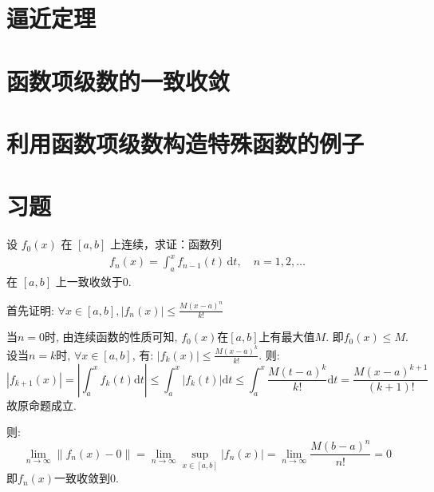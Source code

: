 \section{逼近定理}
\section{函数项级数的一致收敛}
\section{利用函数项级数构造特殊函数的例子}
\section{习题}

\begin{problem}
    设 \(f_0(x)\) 在 \([a, b]\) 上连续，求证：函数列
    \begin{align*}
        f_n(x) = \int_a^x f_{n-1}(t) \, \mathrm{d}t, \quad
        n = 1, 2, \dots
    \end{align*}
    在 \([a, b]\) 上一致收敛于0.
\end{problem}

\begin{solution}
    首先证明: \(\forall x \in [a,b], \left\vert f_{n}(x) \right\vert \le
    \frac{M(x-a)^{n}}{k!} \)

    当\(n=0\)时, 由连续函数的性质可知, \(f_{0}(x)\)在\([a,b]\)上有最大值\(M\).
    即\(f_{0}(x)\le M\).
    设当\(n=k\)时, \(\forall x \in [a,b]\), 有: \(\left\vert f_{k}(x)
        \right\vert \le
    \frac{M(x-a)^{k}}{k!}\). 则:
    \[
        \left\vert f_{k+1}(x) \right\vert
        = \left\vert \int_{a}^{x} f_{k}(t) \mathrm{d}t \right\vert
        \le \int_{a}^{x} \left\vert f_{k}(t) \right\vert \mathrm{d}t
        \le \int_{a}^{x} \frac{M(t-a)^{k}}{k!} \mathrm{d}t =
        \frac{M(x-a)^{k+1}}{(k+1)!}
    \]
    故原命题成立.

    则:
    \[
        \lim_{n \to \infty} \left\lVert f_{n}(x) - 0 \right\rVert
        =\lim_{n \to \infty} \sup_{x \in [a,b]} \left\vert f_{n}(x)
        \right\vert = \lim_{n \to \infty} \frac{M(b-a)^{n}}{n!} = 0
    \]
    即\(f_{n}(x)\)一致收敛到\(0\).
\end{solution}